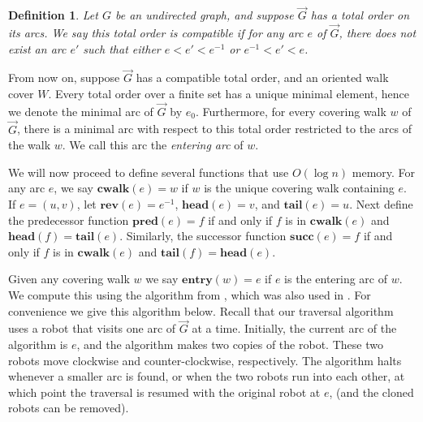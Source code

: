\documentclass[12pt,letterpaper,oneside]{book}
\newcommand{\rev}{\textbf{rev}}
\newcommand{\suc}{\textbf{succ}}
\newcommand{\pred}{\textbf{pred}}
\newcommand{\cwalk}{\textbf{cwalk}}
\newcommand{\entry}{\textbf{entry}}
\newcommand{\head}{\textbf{head}}
\newcommand{\tail}{\textbf{tail}}
\newtheorem{definition}[theorem]{Definition}
\begin{document}
\begin{definition}
\label{def-compatible}
Let $G$ be an undirected graph, and suppose $\vec{G}$ has a total order on its arcs.  
We say this total order is compatible if for 
any arc $e$ of $\vec{G}$, there does not exist an arc $e'$ 
such that either $e<e'<e^{-1}$ or $e^{-1} < e' < e$.
\end{definition}

From now on, suppose $\vec{G}$ has a compatible total order, and an oriented walk cover $W$.  Every total 
order over a finite set has a unique minimal element, hence we denote the minimal arc of $\vec{G}$ by $e_0$.  
Furthermore, for every covering walk $w$ of $\vec{G}$, there is a minimal arc with respect to this total order restricted to the 
arcs of the walk $w$.  We call this arc the \emph{entering arc} of $w$.  


We will now proceed to define several functions that use $O(\log n)$ memory.  
For any arc $e$, we say $\cwalk(e)=w$ if $w$ is the unique covering walk containing $e$.   
If $e=(u,v)$, let $\rev(e)=e^{-1}$, $\head(e)=v$, and $\tail(e)=u$.   
Next define the predecessor function $\pred(e)=f$ if and only if $f$ is in $\cwalk(e)$ and $\head(f)=\tail(e)$.  
Similarly, the successor function $\suc(e)=f$ if and only if $f$ is in $\cwalk(e)$ and $\tail(f)=\head(e)$.  


Given any covering walk $w$ we say $\entry(w)=e$ if $e$ is the entering 
arc of $w$.  We compute this using the algorithm from \cite{BM}, which was also used in \cite{CDKOSU}.  For convenience 
we give this algorithm below.  Recall that our traversal algorithm uses a robot that visits 
one arc of $\vec{G}$ at a time.  Initially, the current arc of the algorithm is $e$, and the algorithm makes two 
copies of the robot.  These two robots move clockwise and counter-clockwise, respectively.  The algorithm halts whenever a smaller 
arc is found, or when the two robots run into each other, at which point the traversal is resumed with 
the original robot at $e$, (and the cloned robots can be removed).   
 
\end{document}

